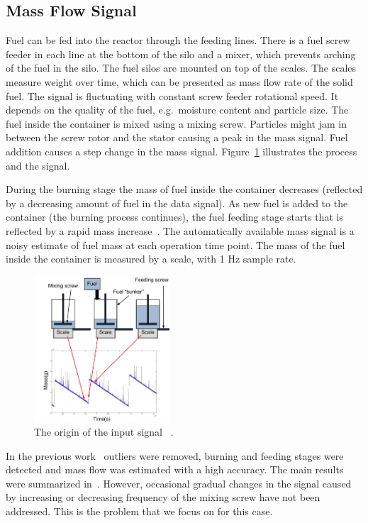 \subsection{Mass Flow Signal}

Fuel can be fed into the reactor through the feeding lines. There is a fuel screw feeder in each line at the bottom of the silo and a mixer, which prevents arching of the fuel in the silo.
The fuel silos are mounted on top of the scales. The scales measure weight over time, which can be presented as mass flow rate of the solid fuel.
The signal is fluctuating with constant screw feeder rotational speed. It depends on the quality of the fuel, e.g.\ moisture content and particle size.
The fuel inside the container is mixed using a mixing screw. Particles might jam in between the screw rotor and the stator causing a peak in the mass signal.
Fuel addition causes a step change in the mass signal. Figure~\ref{fig:OMF} illustrates the process and the signal.

During the burning stage the mass of fuel inside the container decreases (reflected by a decreasing amount of fuel in the data signal). As new fuel is added to the container (the burning process continues),
the fuel feeding stage starts that is reflected by a rapid mass increase~\cite{ZliobaiteBP09}.
The automatically available mass signal is a noisy estimate of fuel mass at each operation time point. The mass of the fuel inside the container is measured by a scale, with 1 Hz sample rate.

\begin{figure}[htb!]
\includegraphics[width=0.45\textwidth]{articles/pics/cfb_paper/OMF/MassFlowScheme}
\caption{The origin of the input signal ~\cite{ZliobaiteBP09}.}\label{fig:OMF}
\end{figure}

In the previous work~\cite{ZliobaiteBP09,BakkerSensorsKDD09,DBLP:conf/incdm/IvannikovPBLJKA09} outliers were removed,
burning and feeding stages were detected and mass flow was estimated with a high accuracy. The main results were summarized in~\cite{PechenizkiySIGKDDExpl09}.
However, occasional gradual changes in the signal caused by increasing or decreasing frequency of the mixing screw have not been addressed.
This is the problem that we focus on for this case.

